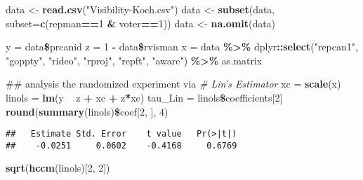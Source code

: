 \documentclass[]{article}
\newenvironment{Shaded}{\begin{snugshade}}{\end{snugshade}}
\newcommand{\KeywordTok}[1]{\textcolor[rgb]{0.13,0.29,0.53}{\textbf{#1}}}
\newcommand{\DataTypeTok}[1]{\textcolor[rgb]{0.13,0.29,0.53}{#1}}
\newcommand{\DecValTok}[1]{\textcolor[rgb]{0.00,0.00,0.81}{#1}}
\newcommand{\StringTok}[1]{\textcolor[rgb]{0.31,0.60,0.02}{#1}}
\newcommand{\CommentTok}[1]{\textcolor[rgb]{0.56,0.35,0.01}{\textit{#1}}}
\newcommand{\OperatorTok}[1]{\textcolor[rgb]{0.81,0.36,0.00}{\textbf{#1}}}
\newcommand{\NormalTok}[1]{#1}
\begin{document}
\begin{Shaded}
\begin{Highlighting}[]
\NormalTok{data <-}\StringTok{ }\KeywordTok{read.csv}\NormalTok{(}\StringTok{"Visibility-Koch.csv"}\NormalTok{)}
\NormalTok{data <-}\StringTok{ }\KeywordTok{subset}\NormalTok{(data, }\DataTypeTok{subset=}\KeywordTok{c}\NormalTok{(repman}\OperatorTok{==}\DecValTok{1} \OperatorTok{&}\StringTok{ }\NormalTok{voter}\OperatorTok{==}\DecValTok{1}\NormalTok{))}
\NormalTok{data <-}\StringTok{ }\KeywordTok{na.omit}\NormalTok{(data)}

\NormalTok{y =}\StringTok{ }\NormalTok{data}\OperatorTok{\$}\NormalTok{prcanid}
\NormalTok{z =}\StringTok{ }\DecValTok{1} \OperatorTok{-}\StringTok{ }\NormalTok{data}\OperatorTok{\$}\NormalTok{rvisman}
\NormalTok{x =}\StringTok{ }\NormalTok{data }\OperatorTok{\%>\%}
\StringTok{  }\NormalTok{dplyr}\OperatorTok{::}\KeywordTok{select}\NormalTok{(}\StringTok{"repcan1"}\NormalTok{, }\StringTok{"goppty"}\NormalTok{, }\StringTok{"rideo"}\NormalTok{, }\StringTok{"rproj"}\NormalTok{, }\StringTok{"repft"}\NormalTok{, }\StringTok{"aware"}\NormalTok{) }\OperatorTok{\%>\%}
\StringTok{  }\NormalTok{as.matrix}

\NormalTok{## analysis the randomized experiment via}
\CommentTok{# Lin's Estimator}
\NormalTok{xc =}\StringTok{ }\KeywordTok{scale}\NormalTok{(x)}
\NormalTok{linols =}\StringTok{ }\KeywordTok{lm}\NormalTok{(y }\OperatorTok{~}\StringTok{ }\NormalTok{z }\OperatorTok{+}\StringTok{ }\NormalTok{xc }\OperatorTok{+}\StringTok{ }\NormalTok{z}\OperatorTok{*}\NormalTok{xc)}
\NormalTok{tau_Lin =}\StringTok{ }\NormalTok{linols}\OperatorTok{\$}\NormalTok{coefficients[}\DecValTok{2}\NormalTok{]}
\KeywordTok{round}\NormalTok{(}\KeywordTok{summary}\NormalTok{(linols)}\OperatorTok{\$}\NormalTok{coef[}\DecValTok{2}\NormalTok{, ], }\DecValTok{4}\NormalTok{)}
\end{Highlighting}
\end{Shaded}

\begin{verbatim}
##   Estimate Std. Error    t value   Pr(>|t|) 
##    -0.0251     0.0602    -0.4168     0.6769
\end{verbatim}

\begin{Shaded}
\begin{Highlighting}[]
\KeywordTok{sqrt}\NormalTok{(}\KeywordTok{hccm}\NormalTok{(linols)[}\DecValTok{2}\NormalTok{, }\DecValTok{2}\NormalTok{])}
\end{Highlighting}
\end{Shaded}
\end{document}
